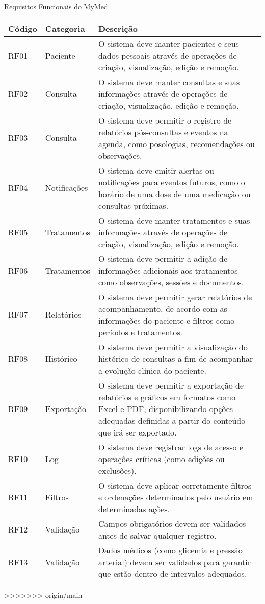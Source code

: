 \begin{quadro}
\caption{Requisitos Funcionais do MyMed}
\begin{tabularx}{\textwidth}{|l|l|X|}
\hline
\textbf{Código} & \textbf{Categoria} & \textbf{Descrição} \\ \hline
RF01 & Paciente & O sistema deve manter pacientes e seus dados pessoais através de operações de criação, visualização, edição e remoção. \\ \hline
RF02 & Consulta & O sistema deve manter consultas e suas informações através de operações de criação, visualização, edição e remoção. \\ \hline
RF03 & Consulta & O sistema deve permitir o registro de relatórios pós-consultas e eventos na agenda, como posologias, recomendações ou observações. \\ \hline
RF04 & Notificações & O sistema deve emitir alertas ou notificações para eventos futuros, como o horário de uma dose de uma medicação ou consultas próximas. \\ \hline
RF05 & Tratamentos & O sistema deve manter tratamentos e suas informações através de operações de criação, visualização, edição e remoção. \\ \hline
RF06 & Tratamentos & O sistema deve permitir a adição de informações adicionais aos tratamentos como observações, sessões e documentos. \\ \hline
RF07 & Relatórios & O sistema deve permitir gerar relatórios de acompanhamento, de acordo com as informações do paciente e filtros como períodos e tratamentos. \\ \hline
RF08 & Histórico & O sistema deve permitir a visualização do histórico de consultas a fim de acompanhar a evolução clínica do paciente. \\ \hline
RF09 & Exportação & O sistema deve permitir a exportação de relatórios e gráficos em formatos como Excel e PDF, disponibilizando opções adequadas definidas a partir do conteúdo que irá ser exportado. \\ \hline
RF10 & Log & O sistema deve registrar logs de acesso e operações críticas (como edições ou exclusões). \\ \hline
RF11 & Filtros & O sistema deve aplicar corretamente filtros e ordenações determinados pelo usuário em determinadas ações. \\ \hline
RF12 & Validação & Campos obrigatórios devem ser validados antes de salvar qualquer registro. \\ \hline
RF13 & Validação & Dados médicos (como glicemia e pressão arterial) devem ser validados para garantir que estão dentro de intervalos adequados. \\ \hline
\end{tabularx}
\end{quadro}
>>>>>>> origin/main
